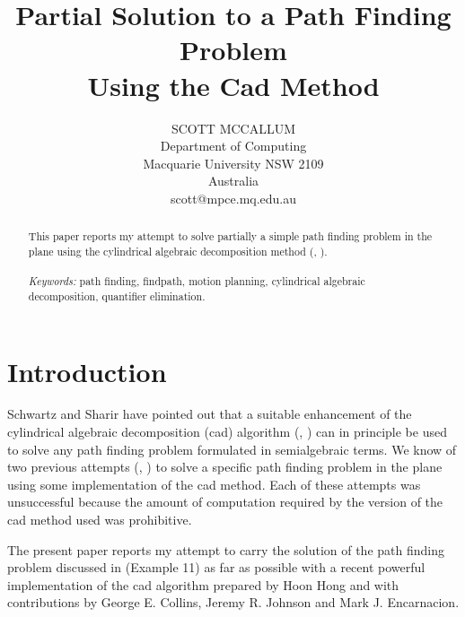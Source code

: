 \newtheorem{theorem}{Theorem}[section]
\newtheorem{lemma}{Lemma}[section]
\newtheorem{corollary}{Corollary}[section]

\title{Partial Solution to a Path Finding Problem\\
       Using the Cad Method}
\author{SCOTT MCCALLUM \\
        Department of Computing \\
        Macquarie University NSW 2109 \\
        Australia \\
        scott@mpce.mq.edu.au}
\maketitle

\begin{abstract}
This paper reports my attempt to solve partially a simple path finding
problem in the plane using the cylindrical algebraic decomposition
method (\cite{Arnon_Collins_McCallum:84a}, \cite{Collins:75}).\\
\\
{\em Keywords:} path finding, findpath, motion planning, cylindrical
algebraic decomposition, quantifier elimination.
\end{abstract}

\section{Introduction}
Schwartz and Sharir \cite{Schwartz_Sharir:83b} have pointed out
that a suitable enhancement of the cylindrical algebraic
decomposition (cad) algorithm (\cite{Collins:75}, 
\cite{Arnon_Collins_McCallum:84a})
can in principle be used to solve any path finding problem formulated in 
semialgebraic terms. We know of two previous attempts 
(\cite{Davenport:86}, \cite{Kalkbrener_Stifter:87}) to solve
a specific path finding problem in the plane using some
implementation of the cad method. Each of these attempts was unsuccessful
because the amount of computation required by the version
of the cad method used was prohibitive.

The present paper reports my attempt to carry the solution of the
path finding problem discussed in \cite{Kalkbrener_Stifter:87}
(Example 11) as far as possible with a recent powerful
implementation of the cad algorithm prepared by Hoon Hong
and with contributions by George E. Collins, Jeremy R. Johnson
and Mark J. Encarnacion.


